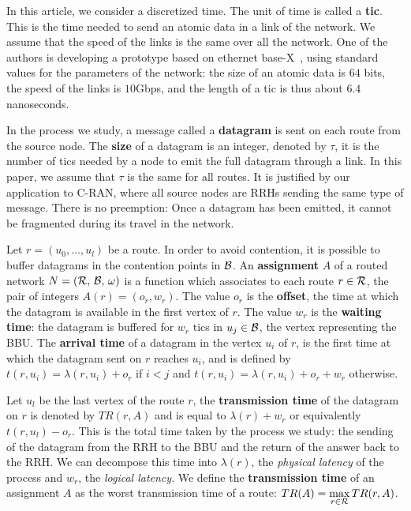 \documentclass[a4paper,10pt]{article}
\begin{document}
 		In this article, we consider a discretized time. The unit of time is called a {\bf tic}. This is the time needed to send an atomic data in a link of the network. We assume that the speed of the links is the same over all the network. One of the authors is developing a prototype based on ethernet base-X~\cite{ieee_8023}, using standard values for the parameters of the network: the size of an atomic data is $64$ bits, the speed of the links is $10$Gbps, and the length of a tic is thus about $6.4$ nanoseconds. 

        In the process we study, a message called a {\bf datagram} is sent on each route from the source node. The \textbf{size} of a datagram is an integer, denoted by $\tau$, it is the number of tics needed by a node to emit the full datagram through a link.  In this paper, we assume that $\tau$ is the same for all routes. It is justified by our application to C-RAN, where all source nodes are RRHs sending the same type of message. There is no preemption: Once a datagram has been emitted, it cannot be fragmented during its travel in the network. 

        Let $r=(u_0,\dots,u_l)$ be a route. In order to avoid contention, it is possible to buffer datagrams in the contention points in $\cal{B}$. An \textbf{assignment} $A$ of a routed network $N = (\cal{R},\,\cal{B},\,\omega)$ is a function which associates to each route $r \in \cal{R}$, the pair of integers $A(r) = (o_r,w_r)$.
        The value $o_r$ is the \textbf{offset}, the time at which the datagram is available in the first vertex of $r$. The value $w_r$ is the \textbf{waiting time}: the datagram is buffered 
        for $w_r$ tics in $u_j \in \cal{B}$, the vertex representing the BBU.
 		The \textbf{arrival time} of a datagram in the vertex $u_i$ of $r$, is the first time at which the datagram sent on $r$ reaches $u_i$, and is defined by $t(r,u_i) = \lambda(r,u_i) + o_r $ if 
 		$i < j$ and $t(r,u_i) = \lambda(r,u_i) + o_r + w_r$ otherwise.

 		 Let $u_l$ be the last vertex of the route $r$, the \textbf{transmission time} of the datagram on 
  		$r$ is denoted by $TR(r,A)$ and is equal to $\lambda(r) + w_r$ or equivalently $t(r,u_l) - o_r$. This is the total time taken by the process we study: the sending of the datagram from the RRH to the BBU and the return of the answer back to the RRH. We can decompose this time into $\lambda(r)$, the \emph{physical latency} of the process and $w_r$, the \emph{logical latency}. 
  		We define the \textbf{transmission time} of an assignment $A$ as the worst transmission time of a route: $TR(A) = \displaystyle \max\limits_{r \in {\cal R}} TR(r,A)$. 
\end{document}
